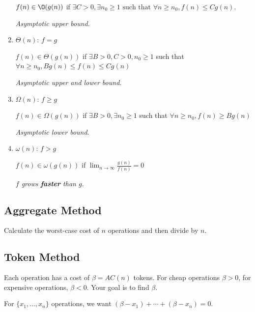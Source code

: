 \documentclass[12pt, letterpaper]{article}
\begin{document}
\begin{multicols*}{3}
\begin{enumerate}
            $f(n) \in \O(g(n))$ if $\exists C > 0, \exists n_0 \ge 1 \text{ such that } \forall n \ge n_0, f(n) \le Cg(n)$.

            {\it Asymptotic upper bound}.
            
            \item $\Theta(n)$: $f = g$
        
            $f(n) \in \Theta(g(n))$ if $\exists B > 0, C > 0, n_0 \ge 1$ such that $\forall n \ge n_0, Bg(n) \le f(n) \le Cg(n)$
            
            {\it Asymptotic upper and lower bound}.
            
            \item $\Omega(n)$: $f \ge g$
        
            $f(n) \in \Omega(g(n))$ if $\exists B > 0, \exists n_0 \ge 1$ such that $\forall n \ge n_0, f(n) \ge Bg(n)$
            
            {\it Asymptotic lower bound}.
            
            \item $\omega(n)$: $f > g$
        
            $f(n) \in \omega(g(n))$ if $\lim_{n \to \infty} \frac{g(n)}{f(n)} = 0$
            
            {\it $f$ grows {\bf faster} than $g$}.
        \end{enumerate}

        \subsection{Aggregate Method}
        Calculate the worst-case cost of $n$ operations and then divide by $n$.

        \subsection{Token Method}

        Each operation has a cost of $\beta = AC(n)$ tokens. For cheap operations $\beta > 0$,
        for expensive operations, $\beta < 0$. Your goal is to find $\beta$.
        
        For $\{x_1, \dots, x_n\}$ operations, we want $(\beta - x_1) + \cdots + (\beta - x_n) = 0$.




\end{multicols*}
\end{document}
